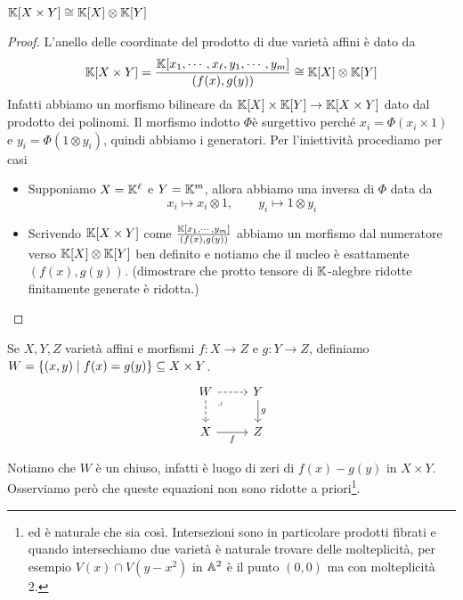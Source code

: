 \begin{proposition}
$\mathbb{K}[X\times Y]\cong \mathbb{K}[X]\otimes\mathbb{K}[Y]$
\end{proposition}
\begin{proof}
L'anello delle coordinate del prodotto di due variet\`a affini \`e dato da
\[\mathbb{K}[X\times Y]=\frac{\mathbb{K}[x_1,\cdots, x_\ell,y_1,\cdots, y_m]}{(f(x),g(y))}\cong \mathbb{K}[X]\otimes \mathbb{K}[Y]\]
Infatti abbiamo un morfismo bilineare da $\mathbb{K}[X]\times\mathbb{K}[Y]\to \mathbb{K}[X\times Y]$ dato dal prodotto dei polinomi. Il morfismo indotto $\Phi $\`e surgettivo perch\'e $x_i=\Phi(x_i\times 1)$ e $y_i=\Phi(1\otimes y_i)$, quindi abbiamo i generatori. Per l'iniettivit\`a procediamo per casi
\begin{itemize}
	\item Supponiamo $X=\mathbb{K}^\ell$ e $Y=\mathbb{K}^m$, allora abbiamo una inversa di $\Phi$ data da
	\[x_i\mapsto x_i\otimes 1,\qquad y_i\mapsto 1\otimes y_i\]
	\item Scrivendo $\mathbb{K}[X\times Y]$ come $\frac{\mathbb{K}[x_1,\cdots, y_m]}{(f(x),g(y))}$ abbiamo un morfismo dal numeratore verso $\mathbb{K}[X]\otimes \mathbb{K}[Y]$ ben definito e notiamo che il nucleo \`e esattamente $(f(x),g(y))$. (dimostrare che protto tensore di $\mathbb{K}$-alegbre ridotte finitamente generate \`e ridotta.)
\end{itemize}
\end{proof}

\begin{definition}
Se $X,Y,Z$ variet\`a affini e morfismi $f:X\to Z$ e $g:Y\to Z$, definiamo $W=\left\{{(x,y)\mid f(x)=g(y)}\right\}\subseteq X\times Y$. 
\[\begin{tikzcd}
	W & Y \\
	X & Z
	\arrow[dashed, from=1-1, to=1-2]
	\arrow[dashed, from=1-1, to=2-1]
	\arrow["\lrcorner"{anchor=center, pos=0.125}, draw=none, from=1-1, to=2-2]
	\arrow["g", from=1-2, to=2-2]
	\arrow["f"', from=2-1, to=2-2]
\end{tikzcd}\]
\end{definition}

\begin{remark}
Notiamo che $W$ \`e un chiuso, infatti \`e luogo di zeri di $f(x)-g(y)$ in $X\times Y$. Osserviamo per\`o che queste equazioni non sono ridotte a priori\footnote{ed \`e naturale che sia cos\`i. Intersezioni sono in particolare prodotti fibrati e quando intersechiamo due variet\`a \`e naturale trovare delle molteplicit\`a, per esempio $V(x)\cap V(y-x^2)$ in $\mathbb{A}^2$ \`e il punto $(0,0)$ ma con molteplicit\`a 2.}.
\end{remark}



